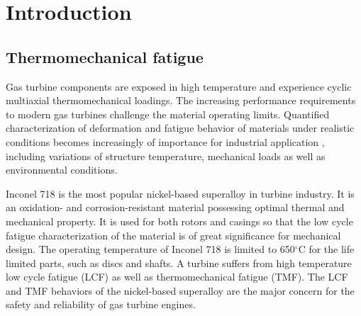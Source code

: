﻿\chapter{Introduction}

\section{Thermomechanical fatigue}
\noindent
Gas turbine components are exposed in high temperature and experience cyclic multiaxial thermomechanical loadings. The increasing performance requirements to modern gas turbines challenge the material operating limits. Quantified characterization of deformation and fatigue behavior of materials under realistic conditions becomes increasingly of importance for industrial application \cite{harrison1996modelling}, including variations of structure temperature, mechanical loads as well as environmental conditions.

Inconel 718 is the most popular nickel-based superalloy in turbine industry. It is an oxidation- and corrosion-resistant material possessing optimal thermal and mechanical property.
It is used for both rotors and casings so that the low cycle fatigue characterization of the material is of great significance for mechanical design. The operating temperature of Inconel 718 is limited to 650$^\circ$C for the life limited parts, such as discs and shafts.
A turbine suffers from high temperature low cycle fatigue (LCF) as well as thermomechanical fatigue (TMF).
The LCF and TMF behaviors of the nickel-based superalloy are the major concern for the safety and reliability of gas turbine engines.


